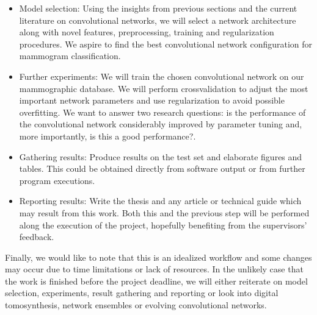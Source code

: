 \begin{itemize}
	\item Model selection: Using the insights from previous sections and the current literature on convolutional networks, we will select a network architecture along with novel features, preprocessing, training and regularization procedures. We aspire to find the best convolutional network configuration for mammogram classification.
	\item Further experiments: We will train the chosen convolutional network on our mammographic database. We will perform crossvalidation to adjust the most important network parameters and use regularization to avoid possible overfitting. We want to answer two research questions: is the performance of the convolutional network considerably improved by parameter tuning and, more importantly, is this a good performance?.
	\item Gathering results: Produce results on the test set and elaborate figures and tables. This could be obtained directly from software output or from further program executions.
	\item Reporting results: Write the thesis and any article or technical guide which may result from this work. Both this and the previous step will be performed along the execution of the project, hopefully benefiting from the supervisors' feedback.
\end{itemize}
Finally, we would like to note that this is an idealized workflow and some changes may occur due to time limitations or lack of resources. In the unlikely case that the work is finished before the project deadline, we will either reiterate on model selection, experiments, result gathering and reporting or look into digital tomosynthesis, network ensembles or evolving convolutional networks.

\begin{comment}
La {\it Metodología} (o lo que algunos autores llaman el {\it Método})
 es el proceso o
conjunto de pasos que debe efectuarse para llegar a cumplir con los
objetivos. Esos pasos deben contener  los experimentos a realizar, la forma de
llevarlos a cabo, la evaluación de los resultados, la prueba de las hipótesis,
la respuesta a las preguntas de investigación y el último paso debe ser el
reporte escrito de los resultados.
\end{comment}
